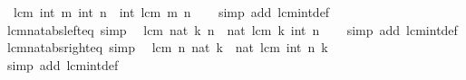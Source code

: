 \begin{isabellebody}
\ \ {\isachardoublequoteopen}lcm\ {\isacharparenleft}{\kern0pt}int\ m{\isacharparenright}{\kern0pt}\ {\isacharparenleft}{\kern0pt}int\ n{\isacharparenright}{\kern0pt}\ {\isacharequal}{\kern0pt}\ int\ {\isacharparenleft}{\kern0pt}lcm\ m\ n{\isacharparenright}{\kern0pt}{\isachardoublequoteclose}\isanewline
%
\isadelimproof
\ \ %
\endisadelimproof
%
\isatagproof
{}\isamarkupfalse%
\ {\isacharparenleft}{\kern0pt}simp\ add{\isacharcolon}{\kern0pt}\ lcm{\isacharunderscore}{\kern0pt}int{\isacharunderscore}{\kern0pt}def{\isacharparenright}{\kern0pt}%
\endisatagproof
{\isafoldproof}%
%
\isadelimproof
\isanewline
%
\endisadelimproof
\isanewline
{}\isamarkupfalse%
\ lcm{\isacharunderscore}{\kern0pt}nat{\isacharunderscore}{\kern0pt}abs{\isacharunderscore}{\kern0pt}left{\isacharunderscore}{\kern0pt}eq\ {\isacharbrackleft}{\kern0pt}simp{\isacharbrackright}{\kern0pt}{\isacharcolon}{\kern0pt}\isanewline
\ \ {\isachardoublequoteopen}lcm\ {\isacharparenleft}{\kern0pt}nat\ {\isasymbar}k{\isasymbar}{\isacharparenright}{\kern0pt}\ n\ {\isacharequal}{\kern0pt}\ nat\ {\isacharparenleft}{\kern0pt}lcm\ k\ {\isacharparenleft}{\kern0pt}int\ n{\isacharparenright}{\kern0pt}{\isacharparenright}{\kern0pt}{\isachardoublequoteclose}\isanewline
%
\isadelimproof
\ \ %
\endisadelimproof
%
\isatagproof
{}\isamarkupfalse%
\ {\isacharparenleft}{\kern0pt}simp\ add{\isacharcolon}{\kern0pt}\ lcm{\isacharunderscore}{\kern0pt}int{\isacharunderscore}{\kern0pt}def{\isacharparenright}{\kern0pt}%
\endisatagproof
{\isafoldproof}%
%
\isadelimproof
\isanewline
%
\endisadelimproof
\isanewline
{}\isamarkupfalse%
\ lcm{\isacharunderscore}{\kern0pt}nat{\isacharunderscore}{\kern0pt}abs{\isacharunderscore}{\kern0pt}right{\isacharunderscore}{\kern0pt}eq\ {\isacharbrackleft}{\kern0pt}simp{\isacharbrackright}{\kern0pt}{\isacharcolon}{\kern0pt}\isanewline
\ \ {\isachardoublequoteopen}lcm\ n\ {\isacharparenleft}{\kern0pt}nat\ {\isasymbar}k{\isasymbar}{\isacharparenright}{\kern0pt}\ {\isacharequal}{\kern0pt}\ nat\ {\isacharparenleft}{\kern0pt}lcm\ {\isacharparenleft}{\kern0pt}int\ n{\isacharparenright}{\kern0pt}\ k{\isacharparenright}{\kern0pt}{\isachardoublequoteclose}\isanewline
%
\isadelimproof
\ \ %
\endisadelimproof
%
\isatagproof
{}\isamarkupfalse%
\ {\isacharparenleft}{\kern0pt}simp\ add{\isacharcolon}{\kern0pt}\ lcm{\isacharunderscore}{\kern0pt}int{\isacharunderscore}{\kern0pt}def{\isacharparenright}{\kern0pt}%
\endisatagproof
{\isafoldproof}%
%
\isadelimproof
\isanewline
%
\endisadelimproof
\isanewline
{}\isamarkupfalse%

\end{isabellebody}
